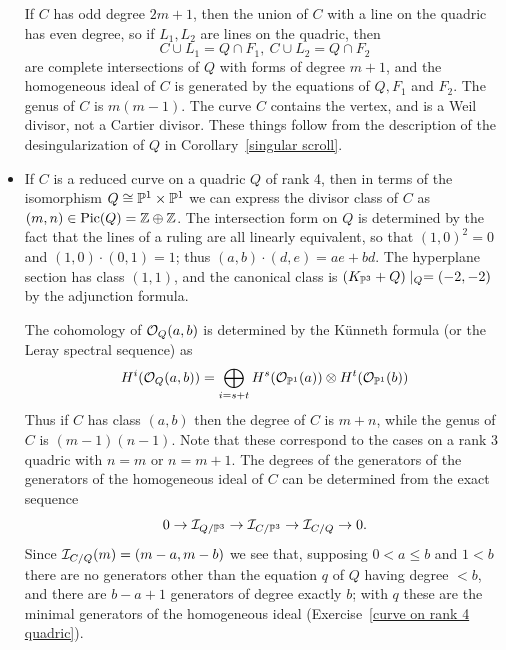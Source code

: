 \begin{example}
\begin{itemize}
If $C$ has odd degree $2m+1$, then the union of $C$ with a line on the quadric has even degree,
so if $L_{1}, L_{2}$ are lines on the quadric, then 
$$
C\cup L_{1} = Q\cap F_{1}, \ C\cup L_{2} = Q\cap F_{2}
$$
are complete intersections of $Q$ with forms of degree $m+1$, and the homogeneous ideal of $C$ is generated by the equations
of $Q,F_{1}$ and $F_{2}$. The genus of $C$ is $m(m-1)$. The curve $C$ contains the vertex, and is a 
Weil divisor, not a Cartier divisor. These things follow from the description of the desingularization
of $Q$ in Corollary~\ref{singular scroll}.

\item If $C$ is a reduced curve on a quadric $Q$ of rank 4, then in terms of the isomorphism
$Q \cong {\mathbb P}^{1}\times {\mathbb P}^{1}$ we can express the divisor class of $C$ as $(m,n)\in \operatorname{Pic}(Q) = {\mathbb Z}\oplus {\mathbb Z}$.
The intersection form on $Q$ is determined by the fact that the lines of a ruling are all linearly equivalent,
so that $(1,0)^{2} =0$ and $(1,0)\cdot (0,1) = 1$; thus $(a,b)\cdot (d,e) = ae+bd$. The hyperplane section
has class $(1,1)$, and the canonical class is $(K_{{\mathbb P}^{3}}+Q)\mid_{Q} = (-2,-2)$ by the adjunction formula. 

The cohomology of ${\mathcal O}_{Q}(a,b)$ is determined by the K\"unneth formula (or the Leray spectral sequence) as
$$
H^{i}({\mathcal O}_{Q}(a,b)) = \bigoplus_{i = s+t}H^{s}({\mathcal O}_{{\mathbb P}^{1}}(a))\otimes H^{t}({\mathcal O}_{{\mathbb P}^{1}}(b))
$$
Thus
if $C$ has class $(a,b)$ then the degree of $C$ is $m+n$, while the genus of $C$ is $(m-1)(n-1)$. Note that these correspond
to the cases on a rank 3 quadric with $n = m$ or $n = m+1$. 
The degrees of the generators of the generators of the homogeneous ideal of $C$ can be determined from the exact sequence
$$
0\to {\mathcal I}_{Q/{\mathbb P}^{3}} \to {\mathcal I}_{C/{\mathbb P}^{3}} \to {\mathcal I}_{C/Q} \to 0.
$$
Since $ {\mathcal I}_{C/Q} (m) = (m-a,m-b)$ we see that, supposing $0<a\leq b$ and $1<b$
there are no generators other than the equation $q$ of $Q$ having degree $<b$, and there are 
$b-a+1$ generators of degree exactly $b$; with $q$ these are the minimal generators of the homogeneous
ideal (Exercise~\ref{curve on rank 4 quadric}).
\end{itemize}

\end{example}


